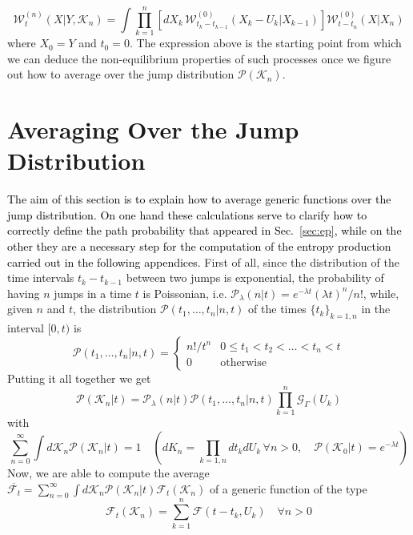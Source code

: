 \documentclass[12pt]{iopart}
\newcommand{\lx} {\left}
\newcommand{\rx} {\right}
\newcommand{\cP} {\mathcal{P}}
\newcommand{\cW} {\mathcal{W}}
\newcommand{\cG} {\mathcal{G}}
\newcommand{\cK} {\mathcal{K}}
\newcommand{\cF} {\mathcal{F}}
\begin{document}
\begin{equation}
\cW^{(n)}_t(X|Y,\cK_n) = \int \prod_{k=1}^n \lx[ dX_k \, \cW^{(0)}_{t_k - t_{k-1}}( X_k - U_k|X_{k-1}) \rx] \cW^{(0)}_{t-t_n}(X|X_n)
\end{equation}
where $X_0=Y$ and $t_0=0$.
The expression above is the starting point from which we can deduce the non-equilibrium properties of such processes once we figure out how to average over the jump distribution $\cP(\cK_n)$.
\section{Averaging Over the Jump Distribution}\label{app:Notation}
\textcolor{black}{The aim of this section is to explain how to average generic functions over the jump distribution. On one hand these calculations serve to clarify how to correctly define the path probability \textcolor{black}{that} appeared in Sec.~\ref{sec:ep}, while on the other they are a necessary step for the computation of the entropy production carried out in the following appendices.}
First of all, since the distribution of the time intervals $t_k - t_{k-1}$ between two jumps is exponential, the probability of having $n$ jumps in a time $t$ is Poissonian, i.e. $\cP_\lambda(n|t) = e^{-\lambda t}(\lambda t)^n/n!$, while, given $n$ and $t$, the distribution $\cP(t_1,\dots,t_n|n,t)$ of the times $\{t_k\}_{k=1,n}$ in the interval $[0,t)$ is 
\begin{equation}
\cP(t_1,\dots,t_n|n,t) = 
\begin{cases}
n!/t^n & 0\leq t_1<t_2<\dots<t_n<t \\
0 & \text{otherwise}
\end{cases}
\end{equation}
Putting it all together we get
\begin{equation}
\cP(\cK_n|t) = \cP_\lambda(n|t) \cP(t_1,\dots,t_n|n,t) \prod_{k=1}^n \cG_\Gamma(U_k) 
\end{equation}
with
\begin{equation}
\sum_{n=0}^\infty \int d\cK_n \cP(\cK_n|t) = 1 \quad \lx( dK_n = \prod_{k=1,n} d t_k dU_k\, \forall n>0,\quad\cP(\cK_0|t)=e^{-\lambda t}\rx)
\end{equation}
Now, we are able to compute the average $\overline{\cF_t}=\sum_{n=0}^\infty \int d\cK_n \cP(\cK_n|t) \cF_t(\cK_n)$  of a generic function of the type 
\begin{equation}
    \cF_t(\cK_n) = \sum_{k=1}^n \cF(t-t_k,U_k) \quad \forall n>0
\end{equation}
\end{document}
